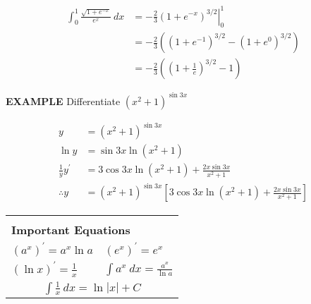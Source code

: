 \documentclass{article}
\begin{document}
\begin{align*}
\int_0^1\frac{\sqrt{1+e^{-x}}}{e^x}\ dx&=\left.-\frac{2}{3}(1+e^{-x})^{3/2}\right|_0^1\\
&=-\frac{2}{3}\left((1+e^{-1})^{3/2}-(1+e^0)^{3/2}\right)\\
&=-\frac{2}{3}\left(\left(1+\frac{1}{e}\right)^{3/2}-1\right)
\end{align*}

{\bf{}EXAMPLE} Differentiate $\displaystyle(x^2+1)^{\sin3x}$

\begin{align*}
y&=(x^2+1)^{\sin3x}\\
\ln y&=\sin3x\ln(x^2+1)\\
\frac{1}{y}y^\prime&=3\cos3x\ln(x^2+1)+\frac{2x\sin3x}{x^2+1}\\
\therefore y&=(x^2+1)^{\sin3x}\left[3\cos3x\ln(x^2+1)+\frac{2x\sin3x}{x^2+1}\right]
\end{align*}

\vspace{10pt}

\begin{center}
\begin{tabular}{|ll|}
\hline&\\
\multicolumn{2}{|l|}{{\bf{}Important Equations}}\\[1em]
$(a^x)^\prime=a^x\ln a$ & $(e^x)^\prime=e^x$\\[1em]
$(\ln x)^\prime=\frac{1}{x}$ & $\displaystyle\int a^x\ dx=\frac{a^x}{\ln a}$\\[1.5em]
\multicolumn{2}{|c|}{$\displaystyle\int\frac{1}{x}\ dx=\ln|x|+C$}\\[1.5em]
\hline
\end{tabular}
\end{center}
\end{document}
